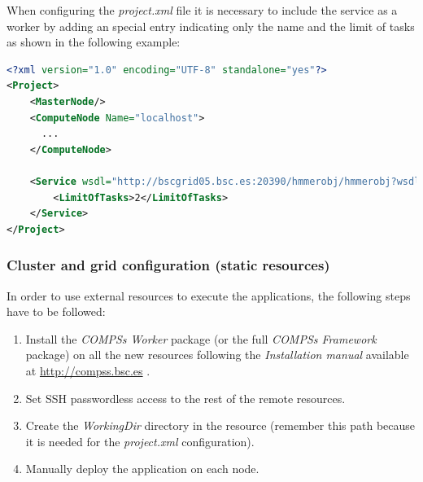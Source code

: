When configuring the \textit{project.xml} file it is necessary to include the service as a worker by adding an
special entry indicating only the name and the limit of tasks as shown in the following example:
\begin{lstlisting}[language=xml]
<?xml version="1.0" encoding="UTF-8" standalone="yes"?>                                                                                                                                                            
<Project>                                                                                                                                                                                                          
    <MasterNode/>                                                                                                                                                                                                  
    <ComputeNode Name="localhost">                                                                                                                                                                                 
      ...                                                                                                                                                                           
    </ComputeNode>   
    
    <Service wsdl="http://bscgrid05.bsc.es:20390/hmmerobj/hmmerobj?wsdl">                                                                                                                                          
        <LimitOfTasks>2</LimitOfTasks>                                                                                                                                                                             
    </Service>                                                                                                                                                                                                     
</Project> 
\end{lstlisting}

\subsubsection{Cluster and grid configuration (static resources)}
In order to use external resources to execute the applications, the following steps have to be followed:

\begin{enumerate}
 \item Install the \textit{COMPSs Worker} package (or the full \textit{COMPSs Framework} package) on all the new 
 resources following the \textit{Installation manual} available at \url{http://compss.bsc.es} .
 \item Set SSH passwordless access to the rest of the remote resources.
 \item Create the \textit{WorkingDir} directory in the resource (remember this path because it is needed 
 for the \textit{project.xml} configuration).
 \item Manually deploy the application on each node.
\end{enumerate}

